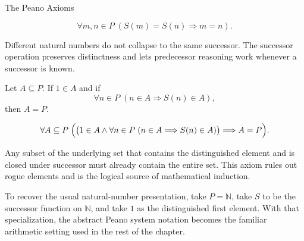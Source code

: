 \begin{topicbox}{The Peano Axioms}
\begin{remark*}
\[
\forall m,n \in P\;(S(m)=S(n) \Longrightarrow m=n).
\]
\end{remark*}

\begin{remark*}[Interpretation]
Different natural numbers do not collapse to the same successor. The successor
operation preserves distinctness and lets predecessor reasoning work whenever a
successor is known.
\end{remark*}

\NoLocalDependencies

\begin{tcolorbox}[colback=axiombox, colframe=axiomborder, arc=2pt,
  left=6pt, right=6pt, top=4pt, bottom=4pt,
  title={\small\textbf{Axiom (Induction Axiom)}},
  fonttitle=\small\bfseries]
\begin{axiom}
\label{ax:peano-induction}
Let $A \subseteq P$. If $1 \in A$ and if
\[
\forall n \in P\;(n \in A \Longrightarrow S(n) \in A),
\]
then $A=P$.
\end{axiom}
\end{tcolorbox}

\begin{remark*}
\[
\forall A \subseteq P\;
\Bigl(\bigl(1 \in A \land
\forall n \in P\;(n \in A \Longrightarrow S(n) \in A)\bigr)
\Longrightarrow A=P\Bigr).
\]
\end{remark*}

\begin{remark*}[Interpretation]
Any subset of the underlying set that contains the distinguished element and is
closed under successor must already contain the entire set. This axiom rules
out rogue elements and is the logical source of mathematical induction.
\end{remark*}

\NoLocalDependencies

\begin{remark*}
To recover the usual natural-number presentation, take $P=\mathbb{N}$, take
$S$ to be the successor function on $\mathbb{N}$, and take $1$ as the
distinguished first element. With that specialization, the abstract Peano
system notation becomes the familiar arithmetic setting used in the rest of
the chapter.
\end{remark*}
\end{topicbox}
